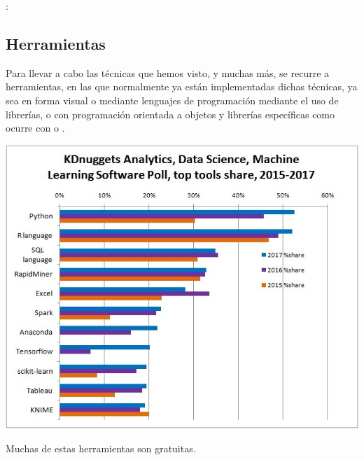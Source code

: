 : 

\subsection{Herramientas}

Para llevar a cabo las técnicas que hemos visto, y muchas más, se recurre a herramientas, en las que normalmente ya están implementadas dichas técnicas, ya sea en forma visual o mediante lenguajes de programación mediante el uso de librerías, o con programación orientada a objetos y librerías específicas como ocurre con  o .
\begin{center}
    \includegraphics[scale=.45]{images/mod01-25.jpg}
\end{center}
Muchas de estas herramientas son gratuitas.


